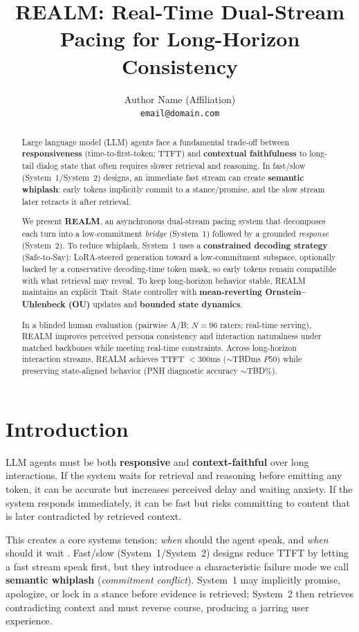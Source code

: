 \documentclass{article}
\title{REALM: Real-Time Dual-Stream Pacing for Long-Horizon Consistency}
\author{
  Author Name (Affiliation) \\
  \texttt{email@domain.com}
}
\begin{document}
\maketitle

\begin{abstract}
Large language model (LLM) agents face a fundamental trade-off between \textbf{responsiveness} (time-to-first-token; TTFT) and \textbf{contextual faithfulness} to long-tail dialog state that often requires slower retrieval and reasoning.
In fast/slow (System~1/System~2) designs, an immediate fast stream can create \textbf{semantic whiplash}: early tokens implicitly commit to a stance/promise, and the slow stream later retracts it after retrieval.

We present \textbf{REALM}, an asynchronous dual-stream pacing system that decomposes each turn into a low-commitment \emph{bridge} (System~1) followed by a grounded \emph{response} (System~2).
To reduce whiplash, System~1 uses a \textbf{constrained decoding strategy} (Safe-to-Say): LoRA-steered generation toward a low-commitment subspace, optionally backed by a conservative decoding-time token mask, so early tokens remain compatible with what retrieval may reveal.
To keep long-horizon behavior stable, REALM maintains an explicit Trait--State controller with \textbf{mean-reverting Ornstein--Uhlenbeck (OU)} updates and \textbf{bounded state dynamics}.

In a blinded human evaluation (pairwise A/B; $N=96$ raters; real-time serving), REALM improves perceived persona consistency and interaction naturalness under matched backbones while meeting real-time constraints.
Across long-horizon interaction streams, REALM achieves TTFT $<300$ms ($\sim$TBDms $P50$) while preserving state-aligned behavior (PNH diagnostic accuracy $\sim$TBD\%).
\end{abstract}

\section{Introduction}

LLM agents must be both \textbf{responsive} and \textbf{context-faithful} over long interactions.
If the system waits for retrieval and reasoning before emitting any token, it can be accurate but increases perceived delay and waiting anxiety.
If the system responds immediately, it can be fast but risks committing to content that is later contradicted by retrieved context.

This creates a core systems tension: \emph{when} should the agent speak, and \emph{when} should it wait \cite{pandian2025snapout}.
Fast/slow (System~1/System~2) designs reduce TTFT by letting a fast stream speak first, but they introduce a characteristic failure mode we call \textbf{semantic whiplash} (\emph{commitment conflict}).
System~1 may implicitly promise, apologize, or lock in a stance before evidence is retrieved; System~2 then retrieves contradicting context and must reverse course, producing a jarring user experience.
\end{document}
